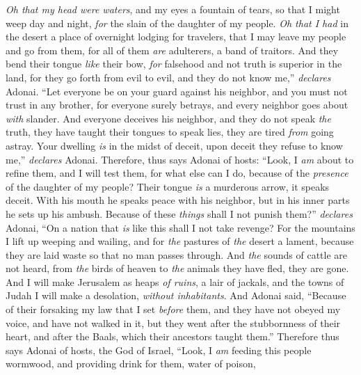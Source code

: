 \begin{biblechapter} %
\verse  \textit{Oh that my head were waters}, 
and my eyes a fountain of tears, 
so that I might weep day and night, 
\textit{for} the slain of the daughter of my people.
\verse \textit{Oh that I had} in the desert a place of overnight lodging for travelers, 
that I may leave my people and go from them, 
for all of them \textit{are} adulterers, 
a band of traitors.
\verse And they bend their tongue \textit{like} their bow, 
\textit{for} falsehood and not truth is superior in the land, 
for they go forth from evil to evil, 
and they do not know me,” \textit{declares} Adonai.
 “Let everyone be on your guard against his neighbor, 
and you must not trust in any brother, 
for everyone surely betrays, 
and every neighbor goes about \textit{with} slander.
\verse And everyone deceives his neighbor, 
and they do not speak \textit{the} truth, 
they have taught their tongues to speak lies, 
they are tired \textit{from} going astray.
\verse Your dwelling \textit{is} in the midst of deceit, 
upon deceit they refuse to know me,” \textit{declares} Adonai.
\verse Therefore, thus says Adonai of hosts:
\verse “Look, I \textit{am} about to refine them, 
and I will test them, 
for what else can I do, 
because of the \textit{presence} of the daughter of my people?
\verse Their tongue \textit{is} a murderous arrow, 
it speaks deceit. 
With his mouth he speaks peace with his neighbor, 
but in his inner parts he sets up his ambush.
\verse Because of these \textit{things} shall I not punish them?” \textit{declares} Adonai, 
“On a nation that \textit{is} like this shall I not take revenge?
\verse For the mountains I lift up weeping and wailing, 
and for \textit{the} pastures of \textit{the} desert a lament, 
because they are laid waste so that no man passes through. 
And \textit{the} sounds of cattle are not heard, 
from \textit{the} birds of heaven to \textit{the} animals 
they have fled, they are gone.
\verse And I will make Jerusalem as heaps \textit{of ruins}, a lair of jackals, 
and the towns of Judah I will make a desolation, \textit{without inhabitants}.
 And Adonai said, “Because of their forsaking my law that I set \textit{before} them, and they have not obeyed my voice, and have not walked in it,
\verse but they went after the stubbornness of their heart, and after the Baals, which their ancestors taught them.”
\verse Therefore thus says Adonai of hosts, the God of Israel, “Look, I \textit{am} feeding this people wormwood, and providing drink for them, water of poison,

\end{biblechapter}
